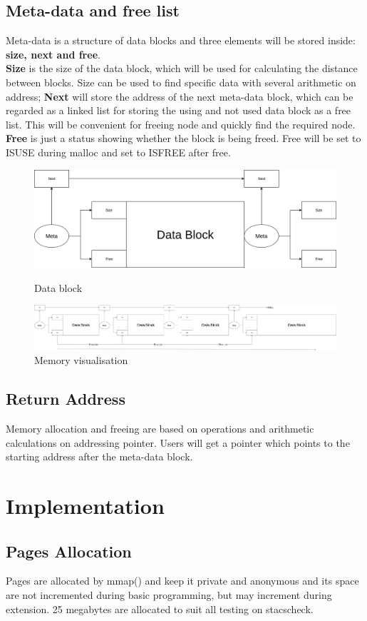 \documentclass[legalpaper]{article}
\begin{document}
	\subsection{Meta-data and free list}
	Meta-data is a structure of data blocks and three elements will be stored inside: \textbf{size, next and free}.\\
	\textbf{Size} is the size of the data block, which will be used for calculating the distance between blocks. Size can be used to find specific data with several arithmetic on address; \textbf{Next} will store the address of the next meta-data block, which can be regarded as a linked list for storing the using and not used data block as a free list. This will be convenient for freeing node and quickly find the required node. \textbf{Free} is just a status showing whether the block is being freed. Free will be set to IS\textunderscore USE during malloc and set to IS\textunderscore FREE after free.
	\begin{figure}[h!]
	\centering
	\includegraphics[width = \textwidth]{P2}
	\caption{Data block}
	\vspace{7mm}
	\includegraphics[width = \textwidth]{P3}
	\caption{Memory visualisation}
	\end{figure}
	\subsection{Return Address}
	Memory allocation and freeing are based on operations and arithmetic calculations on addressing pointer. Users will get a pointer which points to the starting address after the meta-data block. 	
	\section{Implementation}
	\subsection{Pages Allocation}
	Pages are allocated by mmap() and keep it private and anonymous and its space are not incremented during basic programming, but may increment during extension. 25 megabytes are allocated to suit all testing on stacscheck.
\end{document}
